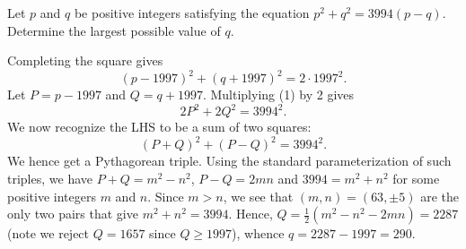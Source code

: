 \begin{question}[290]\label{A::2020-O-1-25}
    Let $p$ and $q$ be positive integers satisfying the equation $p^2 + q^2 = 3994(p-q)$. Determine the largest possible value of $q$.
\end{question}
\begin{solution*}
    Completing the square gives \[(p-1997)^2 + (q+1997)^2 = 2 \cdot 1997^2. \tag{1}\] Let $P = p - 1997$ and $Q = q + 1997$. Multiplying (1) by 2 gives \[2P^2 + 2Q^2 = 3994^2.\] We now recognize the LHS to be a sum of two squares: \[(P+Q)^2 + (P-Q)^2 = 3994^2.\] We hence get a Pythagorean triple. Using the standard parameterization of such triples, we have $P+Q = m^2 - n^2$, $P-Q = 2mn$ and $3994 = m^2 + n^2$ for some positive integers $m$ and $n$. Since $m > n$, we see that $(m, n) = (63, \pm5)$ are the only two pairs that give $m^2 + n^2 = 3994$. Hence, $Q = \frac12 (m^2 - n^2 - 2mn) = 2287$ (note we reject $Q = 1657$ since $Q \geq 1997$), whence $q = 2287 - 1997 = 290$.
\end{solution*}